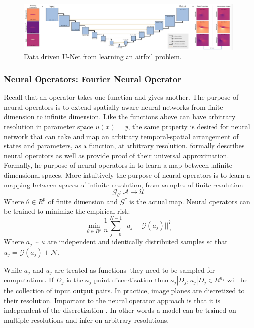 \documentclass[]{article}
\begin{document}
\begin{figure}
	\centering
	\includegraphics[width=1\linewidth]{images/pbdl_unet}
	\caption[pbdlunet]{Data driven U-Net from \cite{pbdl_book} learning an airfoil problem.}
	\label{fig:pbdlunet}
\end{figure}

\subsubsection{Neural Operators: Fourier Neural Operator}
Recall that an operator takes one function and gives another.  The purpose of neural operators is to extend spatially aware neural networks from finite-dimension to infinite dimension.  Like the functions above can have arbitrary resolution in parameter space $u(x) = y$, the same property is desired for neural network that can take and map an arbitrary temporal-spatial arrangement of states and parameters, as a function, at arbitrary resolution.  \cite{neural_operators} formally describes neural operators as well as provide proof of their universal approximation.  Formally, he purpose of neural operators in to learn a map between infinite dimensional spaces.  More intuitively the purpose of neural operators is to learn a mapping between spaces of infinite resolution, from samples of finite resolution.
\begin{equation}
\mathcal{G}_\theta: \mathcal{A} \rightarrow \mathcal{U}
\end{equation}
Where $\theta \in R^p$ of finite dimension and $\mathcal{G}^\dagger$ is the actual map.  Neural operators can be trained to minimize the empirical risk:
\begin{equation}
\min_{\theta \in R^p} \frac{1}{n}\sum_{j=0}^{N-1}||u_j - \mathcal{G}(a_j)||^2_u
\end{equation}
Where $ a_j \sim u$ are independent and identically distributed samples so that $u_j = \mathcal{G}(a_j) + \mathcal{N}$.  

While $a_j$ and $u_j$ are treated as functions, they need to be sampled for computations.  If $D_j$ is the $n_j$ point discretization then $a_j|D_j,u_j|D_j \in R^{n_j}$ will be the collection of input output pairs. In practice, image planes are discretized to their resolution.  Important to the neural operator approach is that it is independent of the discretization \cite{neural_operators}.  In other words a model can be trained on multiple resolutions and infer on arbitrary resolutions.
\end{document}
